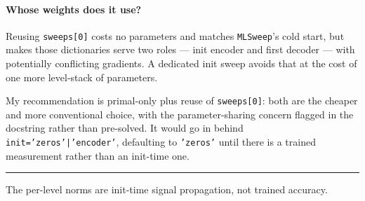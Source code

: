 \documentclass[11pt]{article}
\begin{document}
\paragraph{Whose weights does it use?}
Reusing \texttt{sweeps[0]} costs no parameters and matches \texttt{MLSweep}'s cold start, but makes those
dictionaries serve two roles --- init encoder and first decoder --- with potentially conflicting gradients.
A dedicated init sweep avoids that at the cost of one more level-stack of parameters.

\vspace{0.5em}
\noindent My recommendation is primal-only plus reuse of \texttt{sweeps[0]}: both are the cheaper and more
conventional choice, with the parameter-sharing concern flagged in the docstring rather than pre-solved. It
would go in behind \texttt{init='zeros'|'encoder'}, defaulting to \texttt{'zeros'} until there is a trained
measurement rather than an init-time one.

\vspace{1em}
\hrule
\vspace{0.5em}
\noindent\textcolor{faint}{\footnotesize The per-level norms are init-time signal propagation, not trained
accuracy.}
\end{document}
